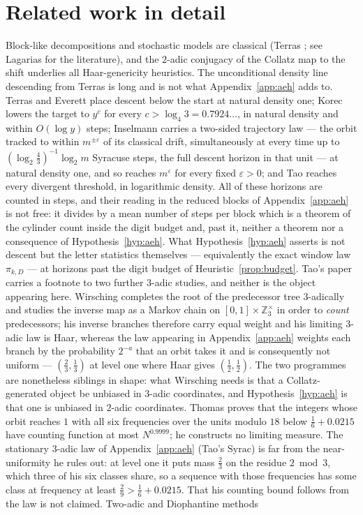 \documentclass[11pt]{article}
\theoremstyle{remark}
\newcommand{\Z}{\mathbb{Z}}
\begin{document}
\section{Related work in detail}\label{app:related}

Block-like decompositions and stochastic models are classical (Terras \cite{terras}; see Lagarias \cite{lagarias} for the literature), and the $2$-adic conjugacy of the Collatz map to the shift underlies all Haar-genericity heuristics. The unconditional density line descending from Terras is long and is not what Appendix~\ref{app:aeh} adds to. Terras \cite{terras} and Everett \cite{everett} place descent below the start at natural density one; Korec \cite{korec} lowers the target to $y^{c}$ for every $c > \log_4 3 = 0.7924\ldots$, in natural density and within $O(\log y)$ steps; Inselmann \cite{inselmann} carries a two-sided trajectory law --- the orbit tracked to within $m^{\pm\varepsilon}$ of its classical drift, simultaneously at every time up to $(\log_2\tfrac43)^{-1}\log_2 m$ Syracuse steps, the full descent horizon in that unit --- at natural density one, and so reaches $m^{\varepsilon}$ for every fixed $\varepsilon>0$; and Tao \cite{tao} reaches every divergent threshold, in logarithmic density. All of these horizons are counted in steps, and their reading in the reduced blocks of Appendix~\ref{app:aeh} is not free: it divides by a mean number of steps per block which is a theorem of the cylinder count inside the digit budget and, past it, neither a theorem nor a consequence of Hypothesis~\ref{hyp:aeh}. What Hypothesis~\ref{hyp:aeh} asserts is not descent but the letter statistics themselves --- equivalently the exact window law $\pi_{k,D}$ --- at horizons past the digit budget of Heuristic~\ref{prop:budget}. Tao's paper carries a footnote to two further $3$-adic studies, and neither is the object appearing here. Wirsching \cite{wirsching} completes the root of the predecessor tree $3$-adically and studies the inverse map as a Markov chain on $[0,1] \times \Z_3^{\times}$ in order to \emph{count} predecessors; his inverse branches therefore carry equal weight and his limiting $3$-adic law is Haar, whereas the law appearing in Appendix~\ref{app:aeh} weights each branch by the probability $2^{-a}$ that an orbit takes it and is consequently not uniform --- $(\tfrac23,\tfrac13)$ at level one where Haar gives $(\tfrac12,\tfrac12)$. The two programmes are nonetheless siblings in shape: what Wirsching needs is that a Collatz-generated object be unbiased in $3$-adic coordinates, and Hypothesis~\ref{hyp:aeh} is that one is unbiased in $2$-adic coordinates. Thomas \cite{thomas} proves that the integers whose orbit reaches $1$ with all six frequencies over the units modulo $18$ below $\tfrac16 + 0.0215$ have counting function at most $N^{0.9999}$; he constructs no limiting measure. The stationary $3$-adic law of Appendix~\ref{app:aeh} (Tao's $\mathrm{Syrac}$) is far from the near-uniformity he rules out: at level one it puts mass $\tfrac23$ on the residue $2 \bmod 3$, which three of his six classes share, so a sequence with those frequencies has some class at frequency at least $\tfrac29 > \tfrac16 + 0.0215$. That his counting bound follows from the law is not claimed. Two-adic and Diophantine methods 
\end{document}
